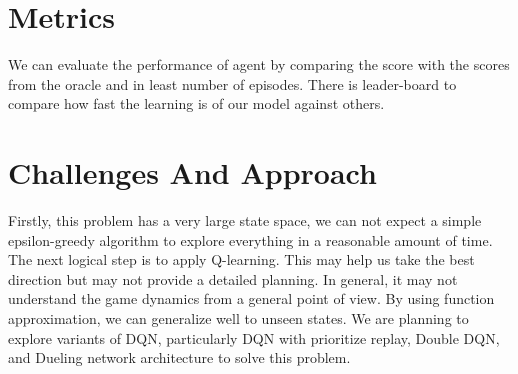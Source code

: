 \documentclass[12pt]{article}
\begin{document}
\section{Metrics}
We can evaluate the performance of agent by comparing the score with the scores from the oracle and in least number of episodes. There is leader-board to compare how fast the learning is of our model against others.\citep{leaderboard}

\section{Challenges And Approach}

Firstly, this problem has a very large state space, we can not expect a simple epsilon-greedy algorithm to explore everything in a reasonable amount of time. The next logical step is to apply Q-learning. This may help us take the best direction but may not provide a detailed planning. In general, it may not understand the game dynamics from a general point of view. By using function approximation, we can generalize well to unseen states. We are planning to explore variants of DQN, particularly DQN with prioritize replay\citep{PrioritizedReplay}, Double DQN\citep{DoubleQ-learning}, and Dueling network architecture \citep{Dueling} to solve this problem.



\end{document}
